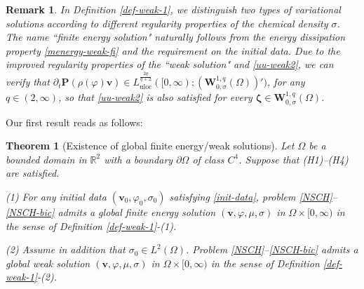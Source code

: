 \documentclass[11pt,reqno]{amsart}
\newtheorem{theorem}{\textbf{Theorem}}[section]
\newtheorem{remark}{\textbf{Remark}}[section]
\newcommand{\uloc}{\operatorname{uloc}}
\def\vv{\bm{v}}
\begin{document}

\begin{remark}\rm
In Definition \ref{def-weak-1}, we distinguish two types of variational solutions according to different regularity properties of the chemical density $\sigma$. The name ``finite energy solution" naturally follows from the energy dissipation property \eqref{menergy-weak-fi} and the requirement on the initial data. Due to the improved regularity properties of the ``weak solution" and \eqref{uu-weak2}, we can verify that $\partial_t\bm{P}(\rho(\varphi)\vv)\in L_{\uloc}^\frac{2q}{q+2}([0,\infty);(\bm{W}^{1,q}_{0,\sigma}(\Omega))')$, for any $q\in (2,\infty)$, so that \eqref{uu-weak2} is also satisfied for every $\bm{\zeta}\in \bm{W}^{1,q}_{0,\sigma}(\Omega)$.
\end{remark}

%
Our first result reads as follows:
%
\begin{theorem}[Existence of global finite energy/weak solutions]
\label{WEAK-SOL}
Let $\Omega$ be a bounded domain in $\mathbb{R}^2$ with a boundary $\partial \Omega$ of class $C^4$. Suppose that (H1)--(H4) are satisfied.

(1) For any initial data $(\bm{v}_0,\varphi_0,\sigma_0)$ satisfying
\eqref{init-data}, problem \eqref{NSCH}--\eqref{NSCH-bic} admits a global finite energy solution $(\vv,\varphi,\mu,\sigma)$ in $\Omega\times [0,\infty)$ in the sense of Definition \ref{def-weak-1}-(1).

(2) Assume in addition that $\sigma_0\in L^2(\Omega)$. Problem \eqref{NSCH}--\eqref{NSCH-bic} admits a global weak solution $(\vv,\varphi,\mu,\sigma)$ in $\Omega\times [0,\infty)$ in the sense of Definition \ref{def-weak-1}-(2).
\end{theorem}
\end{document}
